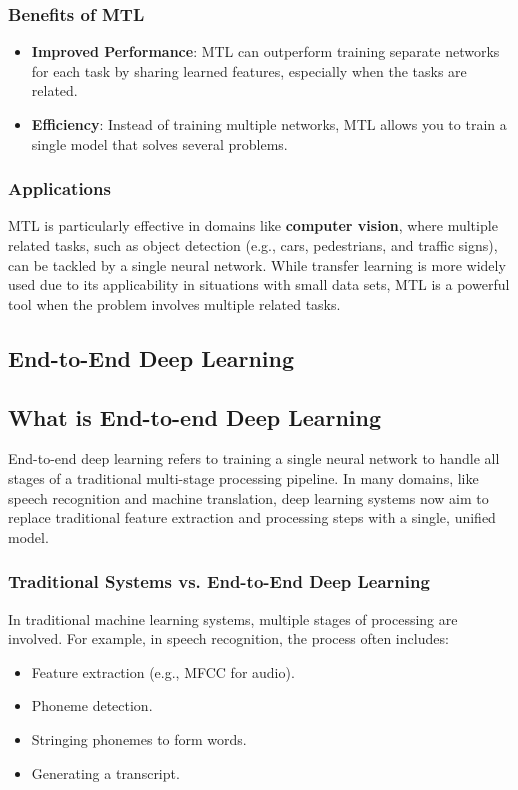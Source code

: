 \documentclass[letterpaper,12pt,notitlepage,twoside]{report}
\begin{document}
\subsubsection*{Benefits of MTL}
\begin{itemize}[nosep]
    \item \textbf{Improved Performance}: MTL can outperform training separate networks for each task by sharing learned features, especially when the tasks are related.
    \item \textbf{Efficiency}: Instead of training multiple networks, MTL allows you to train a single model that solves several problems.
\end{itemize}

\subsubsection*{Applications}
MTL is particularly effective in domains like \textbf{computer vision}, where multiple related tasks, such as object detection (e.g., cars, pedestrians, and traffic signs), can be tackled by a single neural network. While transfer learning is more widely used due to its applicability in situations with small data sets, MTL is a powerful tool when the problem involves multiple related tasks.

\subsection{End-to-End Deep Learning}
\subsection*{What is End-to-end Deep Learning}
End-to-end deep learning refers to training a single neural network to handle all stages of a traditional multi-stage processing pipeline. In many domains, like speech recognition and machine translation, deep learning systems now aim to replace traditional feature extraction and processing steps with a single, unified model.

\subsubsection*{Traditional Systems vs. End-to-End Deep Learning}
In traditional machine learning systems, multiple stages of processing are involved. For example, in speech recognition, the process often includes:
\begin{itemize}[nosep]
    \item Feature extraction (e.g., MFCC for audio).
    \item Phoneme detection.
    \item Stringing phonemes to form words.
    \item Generating a transcript.
\end{itemize}
\end{document}
